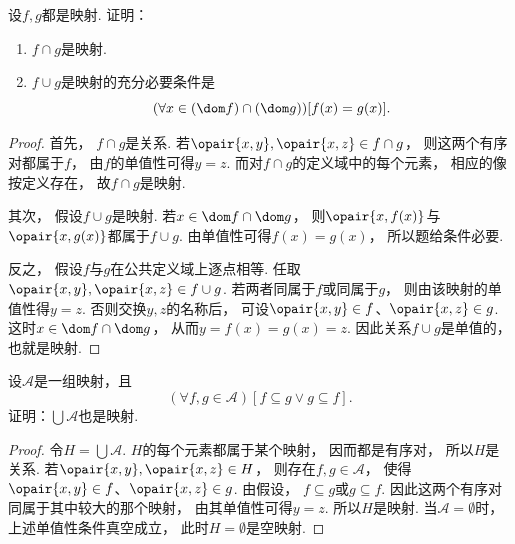 \begin{example}
    设\(f,g\)都是映射.
    证明：
    \begin{enumerate}
        \item \(f \cap g\)是映射.
        \item \(f \cup g\)是映射的充分必要条件是
        \begin{equation*}
            (\forall x \in (\dom f)\cap(\dom g))[f(x)=g(x)].
        \end{equation*}
    \end{enumerate}
    \begin{proof}
        首先，
        \(f\cap g\)是关系.
        若\(\opair{x,y},\opair{x,z}\in f\cap g\)，
        则这两个有序对都属于\(f\)，
        由\(f\)的单值性可得\(y=z\).
        而对\(f\cap g\)的定义域中的每个元素，
        相应的像按定义存在，
        故\(f\cap g\)是映射.

        其次，
        假设\(f\cup g\)是映射.
        若\(x\in\dom f\cap\dom g\)，
        则\(\opair{x,f(x)}\)与\(\opair{x,g(x)}\)都属于\(f\cup g\).
        由单值性可得\(f(x)=g(x)\)，
        所以题给条件必要.

        反之，
        假设\(f\)与\(g\)在公共定义域上逐点相等.
        任取\(\opair{x,y},\opair{x,z}\in f\cup g\).
        若两者同属于\(f\)或同属于\(g\)，
        则由该映射的单值性得\(y=z\).
        否则交换\(y,z\)的名称后，
        可设\(\opair{x,y}\in f\)、\(\opair{x,z}\in g\).
        这时\(x\in\dom f\cap\dom g\)，
        从而\(y=f(x)=g(x)=z\).
        因此关系\(f\cup g\)是单值的，
        也就是映射.
    \end{proof}
\end{example}

\begin{example}
    设\(\mathscr{A}\)是一组映射，且
    \begin{equation*}
        (\forall f,g\in\mathscr{A})[f \subseteq g \lor g \subseteq f].
    \end{equation*}
    证明：\(\bigcup\mathscr{A}\)也是映射.
    \begin{proof}
        令\(H=\bigcup\mathscr{A}\).
        \(H\)的每个元素都属于某个映射，
        因而都是有序对，
        所以\(H\)是关系.
        若\(\opair{x,y},\opair{x,z}\in H\)，
        则存在\(f,g\in\mathscr{A}\)，
        使得\(\opair{x,y}\in f\)、\(\opair{x,z}\in g\).
        由假设，
        \(f\subseteq g\)或\(g\subseteq f\).
        因此这两个有序对同属于其中较大的那个映射，
        由其单值性可得\(y=z\).
        所以\(H\)是映射.
        当\(\mathscr{A}=\emptyset\)时，
        上述单值性条件真空成立，
        此时\(H=\emptyset\)是空映射.
    \end{proof}
\end{example}


